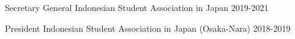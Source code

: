 

\begin{cvhonors}

  \cvhonor
    {Secretary General} %
    {Indonesian Student Association in Japan} %
    {} %
    {2019-2021} %

  \cvhonor
    {President} %
    {Indonesian Student Association in Japan (Osaka-Nara)} %
    {} %
    {2018-2019} %

\end{cvhonors}
